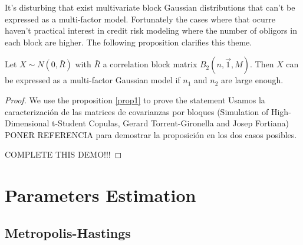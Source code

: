 \documentclass[11pt,fleqn]{book} %
\begin{document}
It's disturbing that exist multivariate block Gaussian distributions 
that can't be expressed as a multi-factor model. Fortunately the 
cases where that ocurre haven't practical interest in credit risk
modeling where the number of obligors in each block are higher. 
The following proposition clarifies this theme.

\begin{proposition}
Let $X \sim N(0,\bar{R})$ with $\bar{R}$ a correlation block matrix 
$B_2(n,\vec{1},M)$. Then $X$ can be expressed as a multi-factor 
Gaussian model if $n_1$ and $n_2$ are large enough.
\end{proposition}
\begin{proof}
We use the proposition \ref{prop1} to prove the statement Usamos la caracterización de las matrices de covarianzas por bloques (Simulation of High-Dimensional t-Student Copulas, Gerard Torrent-Gironella and Josep Fortiana) PONER REFERENCIA para demostrar la proposición en los dos casos posibles.

COMPLETE THIS DEMO!!!
\end{proof}

\chapter{Parameters Estimation}

\section{Metropolis-Hastings}
\end{document}
